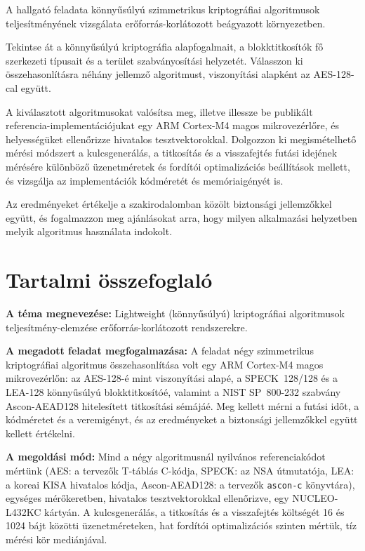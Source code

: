 \documentclass[a4paper,12pt]{report}
\theoremstyle{definition}
\theoremstyle{remark}
\begin{document}
A hallgató feladata könnyűsúlyú szimmetrikus kriptográfiai algoritmusok teljesítményének vizsgálata erőforrás-korlátozott beágyazott környezetben.

Tekintse át a könnyűsúlyú kriptográfia alapfogalmait, a blokktitkosítók fő szerkezeti típusait és a terület szabványosítási helyzetét. Válasszon ki összehasonlításra néhány jellemző algoritmust, viszonyítási alapként az AES-128-cal együtt.

A kiválasztott algoritmusokat valósítsa meg, illetve illessze be publikált referencia-implementációjukat egy ARM Cortex-M4 magos mikrovezérlőre, és helyességüket ellenőrizze hivatalos tesztvektorokkal. Dolgozzon ki megismételhető mérési módszert a kulcsgenerálás, a titkosítás és a visszafejtés futási idejének mérésére különböző üzenetméretek és fordítói optimalizációs beállítások mellett, és vizsgálja az implementációk kódméretét és memóriaigényét is.

Az eredményeket értékelje a szakirodalomban közölt biztonsági jellemzőkkel együtt, és fogalmazzon meg ajánlásokat arra, hogy milyen alkalmazási helyzetben melyik algoritmus használata indokolt.

\chapter*{Tartalmi összefoglaló}

\noindent\textbf{A téma megnevezése:} Lightweight (könnyűsúlyú) kriptográfiai algoritmusok teljesítmény-elemzése erőforrás-korlátozott rendszerekre.

\smallskip
\noindent\textbf{A megadott feladat megfogalmazása:} A feladat négy szimmetrikus kriptográfiai algoritmus összehasonlítása volt egy ARM Cortex-M4 magos mikrovezérlőn: az AES-128-é mint viszonyítási alapé, a SPECK~128/128 és a LEA-128 könnyűsúlyú blokktitkosítóé, valamint a NIST SP~800-232 szabvány Ascon-AEAD128 hitelesített titkosítási sémájáé. Meg kellett mérni a futási időt, a kódméretet és a veremigényt, és az eredményeket a biztonsági jellemzőkkel együtt kellett értékelni.

\smallskip
\noindent\textbf{A megoldási mód:} Mind a négy algoritmusnál nyilvános referenciakódot mértünk (AES: a tervezők T-táblás C-kódja, SPECK: az NSA útmutatója, LEA: a koreai KISA hivatalos kódja, Ascon-AEAD128: a tervezők \texttt{ascon-c} könyvtára), egységes mérőkeretben, hivatalos tesztvektorokkal ellenőrizve, egy NUCLEO-L432KC kártyán. A kulcsgenerálás, a titkosítás és a visszafejtés költségét 16 és 1024 bájt közötti üzenetméreteken, hat fordítói optimalizációs szinten mértük, tíz mérési kör mediánjával.
\end{document}
